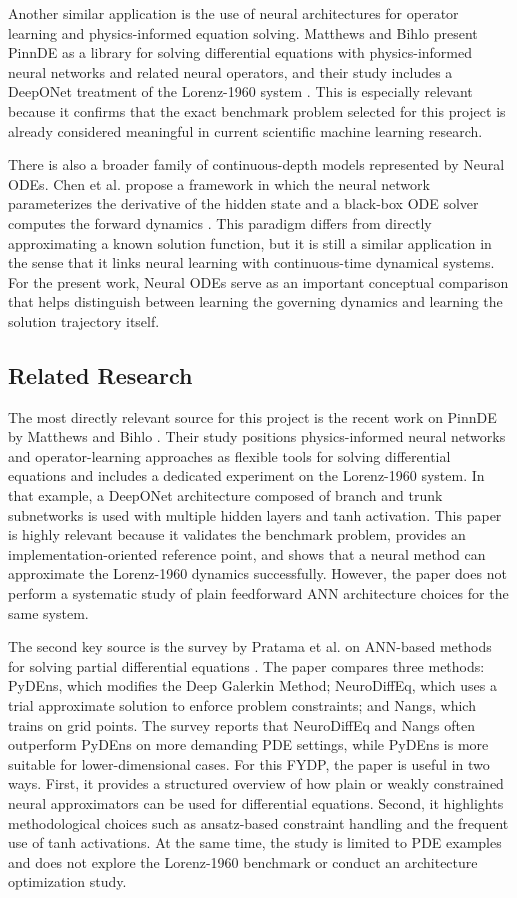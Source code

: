Another similar application is the use of neural architectures for operator learning and physics-informed equation solving. Matthews and Bihlo present PinnDE as a library for solving differential equations with physics-informed neural networks and related neural operators, and their study includes a DeepONet treatment of the Lorenz-1960 system \cite{matthews2025pinnde}. This is especially relevant because it confirms that the exact benchmark problem selected for this project is already considered meaningful in current scientific machine learning research.

There is also a broader family of continuous-depth models represented by Neural ODEs. Chen et al. propose a framework in which the neural network parameterizes the derivative of the hidden state and a black-box ODE solver computes the forward dynamics \cite{chen2019neural}. This paradigm differs from directly approximating a known solution function, but it is still a similar application in the sense that it links neural learning with continuous-time dynamical systems. For the present work, Neural ODEs serve as an important conceptual comparison that helps distinguish between learning the governing dynamics and learning the solution trajectory itself.

\subsection{Related Research}
The most directly relevant source for this project is the recent work on PinnDE by Matthews and Bihlo \cite{matthews2025pinnde}. Their study positions physics-informed neural networks and operator-learning approaches as flexible tools for solving differential equations and includes a dedicated experiment on the Lorenz-1960 system. In that example, a DeepONet architecture composed of branch and trunk subnetworks is used with multiple hidden layers and tanh activation. This paper is highly relevant because it validates the benchmark problem, provides an implementation-oriented reference point, and shows that a neural method can approximate the Lorenz-1960 dynamics successfully. However, the paper does not perform a systematic study of plain feedforward ANN architecture choices for the same system.

The second key source is the survey by Pratama et al. on ANN-based methods for solving partial differential equations \cite{pratama2022ann}. The paper compares three methods: PyDEns, which modifies the Deep Galerkin Method; NeuroDiffEq, which uses a trial approximate solution to enforce problem constraints; and Nangs, which trains on grid points. The survey reports that NeuroDiffEq and Nangs often outperform PyDEns on more demanding PDE settings, while PyDEns is more suitable for lower-dimensional cases. For this FYDP, the paper is useful in two ways. First, it provides a structured overview of how plain or weakly constrained neural approximators can be used for differential equations. Second, it highlights methodological choices such as ansatz-based constraint handling and the frequent use of tanh activations. At the same time, the study is limited to PDE examples and does not explore the Lorenz-1960 benchmark or conduct an architecture optimization study.


